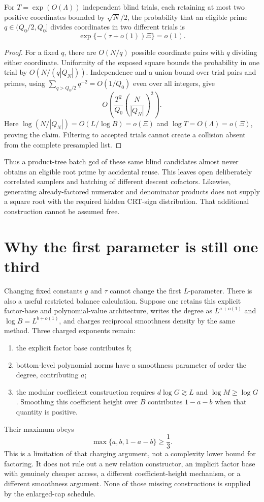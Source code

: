 \begin{proposition}
For $T=\exp(O(\Lambda))$ independent blind trials, each retaining
at most two positive coordinates bounded by $\sqrt N/2$, the
probability that an eligible prime $q\in(Q_0/2,Q_0]$ divides
coordinates in two different trials is
\[
 \exp\{-(\tau+o(1))\Xi\}=o(1).
\]
\end{proposition}
\begin{proof}
For a fixed $q$, there are $O(N/q)$ possible coordinate pairs
with $q$ dividing either coordinate.  Uniformity of the exposed
square bounds the probability in one trial by
$O(N/(q|Q_N|))$.  Independence and a union bound over trial
pairs and primes, using
$\sum_{q>Q_0/2}q^{-2}=O(1/Q_0)$ even over all integers, give
\[
 O\left(\frac{T^2}{Q_0}
            \left(\frac{N}{|Q_N|}\right)^2\right).
\]
Here $\log(N/|Q_N|)=O(L/\log B)=o(\Xi)$ and
$\log T=O(\Lambda)=o(\Xi)$, proving the claim.
Filtering to accepted trials cannot create a collision absent
from the complete presampled list.
\end{proof}

Thus a product-tree batch gcd of these same blind candidates
almost never obtains an eligible root prime by accidental
reuse.  This leaves open deliberately correlated samplers and
batching of different descent cofactors.
Likewise, generating already-factored numerator and denominator
products does not supply a square root with the required hidden
CRT-sign distribution.  That additional construction cannot be
assumed free.

\section{Why the first parameter is still one third}

Changing fixed constants $g$ and $\tau$ cannot change the first
$L$-parameter.  There is also a useful restricted balance
calculation.  Suppose one retains this explicit factor-base and
polynomial-value architecture, writes the degree as
$L^{a+o(1)}$ and $\log B=L^{b+o(1)}$, and charges reciprocal
smoothness density by the same method.  Three charged exponents
remain:
\begin{enumerate}[leftmargin=*]
\item the explicit factor base contributes $b$;
\item bottom-level polynomial norms have a smoothness parameter
of order the degree, contributing $a$;
\item the modular coefficient construction requires
$d\log G\gtrsim L$ and $\log M\ge\log G$.
Smoothing this coefficient height over $B$ contributes
$1-a-b$ when that quantity is positive.
\end{enumerate}
Their maximum obeys
\[
 \max\{a,b,1-a-b\}\ge\frac13.
\]
This is a limitation of that charging argument, not a complexity
lower bound for factoring.  It does not rule out a new relation
constructor, an implicit factor base with genuinely cheaper
access, a different coefficient-height mechanism, or a different
smoothness argument.  None of those missing constructions is
supplied by the enlarged-cap schedule.

